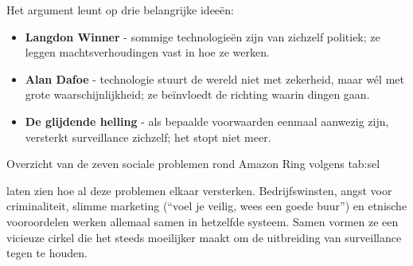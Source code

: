 \documentclass[nonacm, sigconf]{acmart}
\begin{document}
    \vsmall

    \noindent Het argument leunt op drie belangrijke ideeën:
    \begin{itemize}
        \item \textbf{Langdon Winner} - sommige technologieën zijn van zichzelf politiek; ze leggen machtsverhoudingen vast in hoe ze werken.
        \item \textbf{Alan Dafoe} - technologie stuurt de wereld niet met zekerheid, maar wél met grote waarschijnlijkheid; ze beïnvloedt de richting waarin dingen gaan.
        \item \textbf{De glijdende helling} - als bepaalde voorwaarden eenmaal aanwezig zijn, versterkt surveillance zichzelf; het stopt niet meer.
    \end{itemize}

    \vsmall

    \begin{SimpleTable}[s{0.3}s{1.2}]
    {Overzicht van de zeven sociale problemen rond Amazon Ring volgens \citeauthor{selinger2022amazon}}
    {tab:sel}
    \end{SimpleTable}

    \citeauthor{selinger2022amazon} laten zien hoe al deze problemen elkaar versterken.
    Bedrijfswinsten, angst voor criminaliteit, slimme marketing (``voel je veilig, wees een goede buur'') en etnische vooroordelen werken allemaal samen in hetzelfde systeem.
    Samen vormen ze een vicieuze cirkel die het steeds moeilijker maakt om de uitbreiding van surveillance tegen te houden.
\end{document}
